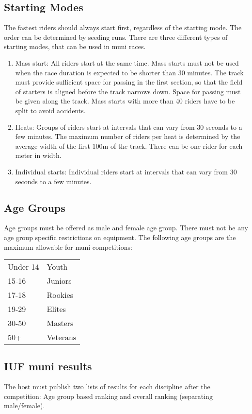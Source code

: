 \subsection{Starting Modes}
\label{sec:muni-starting-modes}
The fastest riders should always start first, regardless of the starting mode.
The order can be determined by seeding runs. There are three different types of
starting modes, that can be used in muni races.

\begin{enumerate}
\item Mass start: All riders start at the same time. Mass starts must not be
      used when the race duration is expected to be shorter than 30 minutes. The
      track must provide sufficient space for passing in the first section, so
      that the field of starters is aligned before the track narrows down. Space
      for passing must be given along the track. Mass starts with more than 40
      riders have to be split to avoid accidents.
\item Heats: Groups of riders start at intervals that can vary from 30 seconds
      to a few minutes. The maximum number of riders per heat is determined by
      the average width of the first 100m of the track. There can be one rider
      for each meter in width.
\item Individual starts: Individual riders start at intervals that can vary from
      30 seconds to a few minutes.
\end{enumerate}

\subsection{Age Groups}
\label{sec:muni-age-groups}
Age groups must be offered as male and female age group.
There must not be any age group specific restrictions on equipment.
The following age groups are the maximum allowable for muni competitions:\\
%
\begin{tabular}{ l l}
Under 14 & Youth \\
15-16 & Juniors \\
17-18 & Rookies \\
19-29 & Elites \\
30-50 & Masters \\
50+ & Veterans \\
\end{tabular}


\subsection{IUF muni results}
\label{sec:muni-results}
The host must publish two lists of results for each discipline after the
competition: Age group based ranking and overall ranking (separating
male/female).

